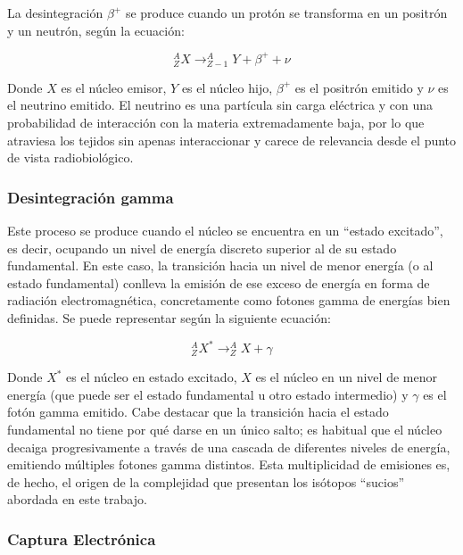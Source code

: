 La desintegración $\beta^{+}$ se produce cuando un protón se transforma en un positrón y un neutrón, según la ecuación:

\begin{equation}
      ^{A}_{Z}X \rightarrow ^{A}_{Z-1}Y + \beta^{+} + \nu \label{eq:desintegracion_beta_mas}
\end{equation}

Donde $X$ es el núcleo emisor, $Y$ es el núcleo hijo, $\beta^{+}$ es el positrón emitido y $\nu$ es el neutrino emitido. El neutrino es una partícula sin carga eléctrica y con una probabilidad de interacción con la materia extremadamente baja, por lo que atraviesa los tejidos sin apenas interaccionar y carece de relevancia desde el punto de vista radiobiológico.

\subsubsection{Desintegración gamma}

Este proceso se produce cuando el núcleo se encuentra en un \enquote{estado excitado}, es decir, ocupando un nivel de energía discreto superior al de su estado fundamental. En este caso, la transición hacia un nivel de menor energía (o al estado fundamental) conlleva la emisión de ese exceso de energía en forma de radiación electromagnética, concretamente como fotones gamma de energías bien definidas. Se puede representar según la siguiente ecuación:

\begin{equation}
      ^{A}_{Z}X^{*} \rightarrow ^{A}_{Z}X + \gamma \label{eq:desintegracion_gamma}
\end{equation}

Donde $X^{*}$ es el núcleo en estado excitado, $X$ es el núcleo en un nivel de menor energía (que puede ser el estado fundamental u otro estado intermedio) y $\gamma$ es el fotón gamma emitido. Cabe destacar que la transición hacia el estado fundamental no tiene por qué darse en un único salto; es habitual que el núcleo decaiga progresivamente a través de una cascada de diferentes niveles de energía, emitiendo múltiples fotones gamma distintos. Esta multiplicidad de emisiones es, de hecho, el origen de la complejidad que presentan los isótopos \enquote{sucios} abordada en este trabajo.

\subsubsection{Captura Electrónica}

